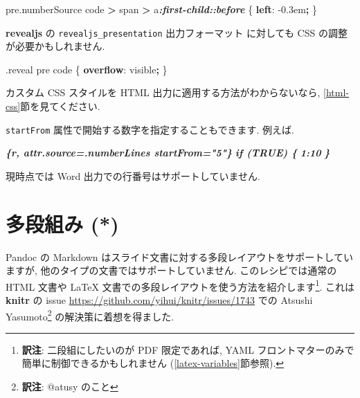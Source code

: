 \documentclass[
  11pt,
  lualatex,ja=standard,jafont=noto]{bxjsreport}
\newenvironment{Shaded}{\begin{snugshade}}{\end{snugshade}}
\newcommand{\DataTypeTok}[1]{\textcolor[rgb]{0.13,0.29,0.53}{#1}}
\newcommand{\DecValTok}[1]{\textcolor[rgb]{0.00,0.00,0.81}{#1}}
\newcommand{\FunctionTok}[1]{\textcolor[rgb]{0.00,0.00,0.00}{#1}}
\newcommand{\InformationTok}[1]{\textcolor[rgb]{0.56,0.35,0.01}{\textbf{\textit{#1}}}}
\newcommand{\KeywordTok}[1]{\textcolor[rgb]{0.13,0.29,0.53}{\textbf{#1}}}
\newcommand{\NormalTok}[1]{#1}
\newcommand{\OperatorTok}[1]{\textcolor[rgb]{0.81,0.36,0.00}{\textbf{#1}}}
\begin{document}
\begin{Shaded}
\begin{Highlighting}[]
\NormalTok{pre}\FunctionTok{.numberSource}\NormalTok{ code }\OperatorTok{\textgreater{}}\NormalTok{ span }\OperatorTok{\textgreater{}}\NormalTok{ a}\InformationTok{:first{-}child::before}\NormalTok{ \{}
  \KeywordTok{left}\NormalTok{: }\DecValTok{{-}0.3}\DataTypeTok{em}\OperatorTok{;}
\NormalTok{\}}
\end{Highlighting}
\end{Shaded}

\textbf{revealjs} の \texttt{revealjs\_presentation} 出力フォーマット \autocite{R-revealjs} に対しても CSS の調整が必要かもしれません.

\begin{Shaded}
\begin{Highlighting}[]
\FunctionTok{.reveal}\NormalTok{ pre code \{}
  \KeywordTok{overflow}\NormalTok{: }\DecValTok{visible}\OperatorTok{;}
\NormalTok{\}}
\end{Highlighting}
\end{Shaded}

カスタム CSS スタイルを HTML 出力に適用する方法がわからないなら, \ref{html-css}節を見てください.

\texttt{startFrom} 属性で開始する数字を指定することもできます. 例えば.

\begin{Shaded}
\begin{Highlighting}[]
\InformationTok{\textasciigrave{}\textasciigrave{}\textasciigrave{}\{r, attr.source=\textquotesingle{}.numberLines startFrom="5"\textquotesingle{}\}}
\InformationTok{if (TRUE) \{}
\InformationTok{  1:10}
\InformationTok{\}}
\InformationTok{\textasciigrave{}\textasciigrave{}\textasciigrave{}}
\end{Highlighting}
\end{Shaded}

現時点では Word 出力での行番号はサポートしていません.

\hypertarget{multi-column}{%
\section{多段組み (*)}\label{multi-column}}

Pandoc の Markdown はスライド文書に対する多段レイアウトをサポートしていますが, 他のタイプの文書ではサポートしていません. このレシピでは通常の HTML 文書や LaTeX 文書での多段レイアウトを使う方法を紹介します\footnote{\textbf{訳注}: 二段組にしたいのが PDF 限定であれば, YAML フロントマターのみで簡単に制御できるかもしれません (\ref{latex-variables}節参照).}. これは \textbf{knitr} の issue \url{https://github.com/yihui/knitr/issues/1743} での Atsushi Yasumoto\footnote{\textbf{訳注}: @atusy のこと} の解決策に着想を得ました.
\end{document}
